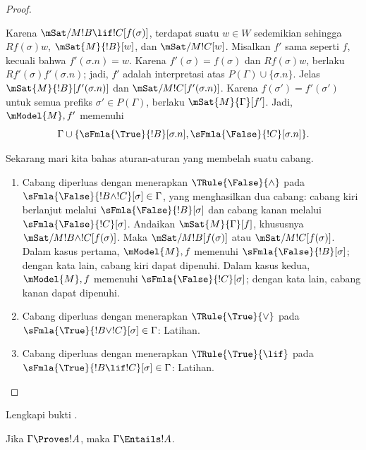 \documentclass[../../../include/open-logic-section]{subfiles}
\begin{document}
\begin{proof}
\begin{enumerate}
  Karena $\mSat/{M}{!B \lif !C}[f(\sigma)]$, terdapat suatu $w \in W$
  sedemikian sehingga $Rf(\sigma)w$, $\mSat{M}{!B}[w]$, dan
  $\mSat/{M}{!C}[w]$. Misalkan $f'$ sama seperti $f$, kecuali bahwa
  $f'(\sigma.n) = w$. Karena $f'(\sigma) = f(\sigma)$ dan
  $Rf(\sigma)w$, berlaku $Rf'(\sigma)f'(\sigma.n)$; jadi, $f'$ adalah
  interpretasi atas $P(\Gamma) \cup \{\sigma.n\}$. Jelas
  $\mSat{M}{!B}[f'(\sigma.n)]$ dan
  $\mSat/{M}{!C}[f'(\sigma.n)]$. Karena
  $f(\sigma') = f'(\sigma')$ untuk semua prefiks
  $\sigma' \in P(\Gamma)$, berlaku $\mSat{M}{\Gamma}[f']$. Jadi,
  $\mModel{M}, f'$ memenuhi
  \[
  \Gamma \cup \{\sFmla{\True}{!B}[\sigma.n],
                  \sFmla{\False}{!C}[\sigma.n]\}.
  \]
\end{enumerate}
Sekarang mari kita bahas aturan-aturan yang membelah suatu cabang.
\begin{enumerate}
\item Cabang diperluas dengan menerapkan $\TRule{\False}{\land}$ pada
  $\sFmla{\False}{!B \land !C}[\sigma] \in \Gamma$, yang menghasilkan
  dua cabang: cabang kiri berlanjut melalui
  $\sFmla{\False}{!B}[\sigma]$ dan cabang kanan melalui
  $\sFmla{\False}{!C}[\sigma]$. Andaikan $\mSat{M}{\Gamma}[f]$,
  khususnya $\mSat/{M}{!B \land !C}[f(\sigma)]$. Maka
  $\mSat/{M}{!B}[f(\sigma)]$ atau $\mSat/{M}{!C}[f(\sigma)]$. Dalam
  kasus pertama, $\mModel{M}, f$ memenuhi
  $\sFmla{\False}{!B}[\sigma]$; dengan kata lain, cabang kiri dapat
  dipenuhi. Dalam kasus kedua, $\mModel{M}, f$ memenuhi
  $\sFmla{\False}{!C}[\sigma]$; dengan kata lain, cabang kanan dapat
  dipenuhi.
\item Cabang diperluas dengan menerapkan $\TRule{\True}{\lor}$ pada
  $\sFmla{\True}{!B \lor !C}[\sigma] \in \Gamma$: Latihan.
\item Cabang diperluas dengan menerapkan $\TRule{\True}{\lif}$ pada
  $\sFmla{\True}{!B \lif !C}[\sigma] \in \Gamma$: Latihan.
\end{enumerate}
\end{proof}

\begin{prob}
Lengkapi bukti .
\end{prob}

\begin{cor}
Jika $\Gamma \Proves !A$, maka $\Gamma \Entails !A$.
\end{cor}
\end{document}
